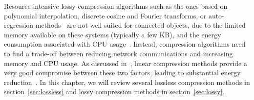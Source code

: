 Resource-intensive lossy compression algorithms such as the ones based on
polynomial interpolation, discrete cosine and Fourier transforms, or
auto-regression methods~\cite{lu2010optimized} are not well-suited for
connected objects, due to the limited memory available on these systems
(typically a few KB), and the energy consumption associated with CPU
usage~\cite{li2018multi}. Instead, compression algorithms need to find a
trade-off between reducing network communications and increasing memory and CPU
usage. As discussed in~\cite{zordan2014performance}, linear compression methods
provide a very good compromise between these two factors, leading to
substantial energy reduction~\cite{li2018multi}. In this chapter, we will
review several lossless compression methods in section~\ref{sec:lossless} and
lossy compression methods in section~\ref{sec:lossy}.
